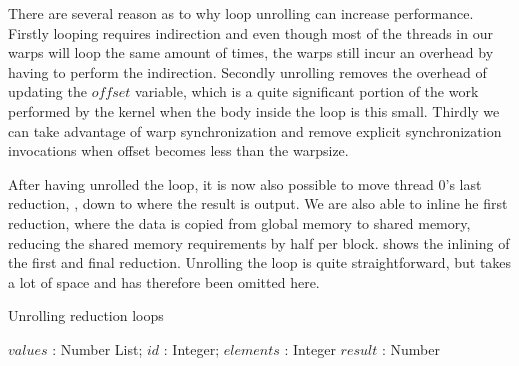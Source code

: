 There are several reason as to why loop unrolling can increase
performance. Firstly looping requires indirection and even though most
of the threads in our warps will loop the same amount of times, the
warps still incur an overhead by having to perform the
indirection. Secondly unrolling removes the overhead of updating the
$offset$ variable, which is a quite significant portion of the work
performed by the kernel when the body inside the loop is this
small. Thirdly we can take advantage of warp synchronization and
remove explicit synchronization invocations when offset becomes less
than the warpsize.


After having unrolled the loop, it is now also possible to move thread
0's last reduction, , down to where the
result is output. We are also able to inline he first reduction, where
the data is copied from global memory to shared memory, reducing the
shared memory requirements by half per
block.  shows the inlining of the first and
final reduction. Unrolling the loop is quite straightforward, but
takes a lot of space and has therefore been omitted here.


\begin{algorithm}
  \caption{Unrolling reduction loops}
  \label{alg:unrollReduct}
  \begin{algorithmic}
              {$values$ : Number List; $id$ : Integer; $elements$ : Integer}
              {$result$ : Number}
              {
                \SYNC
                  \ENDIF
                  \SYNC
                \ENDWHILE
                \ENDIF
              }
  \end{algorithmic}
\end{algorithm}

